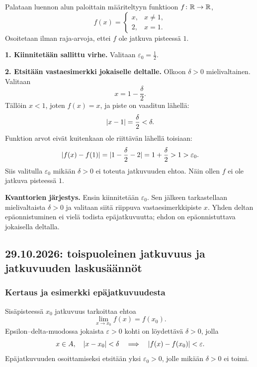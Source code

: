 \documentclass[11pt,a4paper]{amsart}
\begin{document}
\begin{example}
  Palataan luennon alun paloittain määriteltyyn funktioon
  $f\colon\mathbb{R}\to\mathbb{R}$,
  \[
    f(x)=
    \begin{cases}
      x, & x\ne 1,\\
      2, & x=1.
    \end{cases}
  \]
  Osoitetaan ilman raja-arvoja, ettei $f$ ole jatkuva pisteessä $1$.
\end{example}

\begin{solution}
  \textbf{1. Kiinnitetään sallittu virhe.}
  Valitaan $\varepsilon_0=\frac12$.

  \medskip
  \noindent\textbf{2. Etsitään vastaesimerkki jokaiselle deltalle.}
  Olkoon $\delta>0$ mielivaltainen. Valitaan
  \[
    x=1-\frac{\delta}{2}.
  \]
  Tällöin $x<1$, joten $f(x)=x$, ja piste on vaaditun lähellä:
  \[
    \lvert x-1\rvert=\frac{\delta}{2}<\delta.
  \]
  Funktion arvot eivät kuitenkaan ole riittävän lähellä toisiaan:
  \[
    \lvert f(x)-f(1)\rvert
    =\lvert1-\frac{\delta}{2}-2\rvert
    =1+\frac{\delta}{2}
    >1>\varepsilon_0.
  \]
  Siis valitulla $\varepsilon_0$ mikään $\delta>0$ ei toteuta
  jatkuvuuden ehtoa. Näin ollen $f$ ei ole jatkuva pisteessä $1$.
\end{solution}

\medskip
\noindent\textbf{Kvanttorien järjestys.}
Ensin kiinnitetään $\varepsilon_0$. Sen jälkeen tarkastellaan
mielivaltaista $\delta>0$ ja valitaan siitä riippuva vastaesimerkkipiste
$x$. Yhden deltan epäonnistuminen ei vielä todista epäjatkuvuutta;
ehdon on epäonnistuttava jokaisella deltalla.

\newpage
\subsection{29.10.2026: toispuoleinen jatkuvuus ja jatkuvuuden laskusäännöt}

\subsubsection*{Kertaus ja esimerkki epäjatkuvuudesta}

Sisäpisteessä $x_0$ jatkuvuus tarkoittaa ehtoa
\[
  \lim_{x\to x_0}f(x)=f(x_0).
\]
Epsilon--delta-muodossa jokaista
$\varepsilon>0$ kohti on löydettävä $\delta>0$, jolla
\[
  x\in A,\quad \lvert x-x_0\rvert<\delta
  \quad\Longrightarrow\quad \lvert f(x)-f(x_0)\rvert<\varepsilon.
\]
Epäjatkuvuuden osoittamiseksi etsitään yksi $\varepsilon_0>0$, jolle
mikään $\delta>0$ ei toimi.
\end{document}
